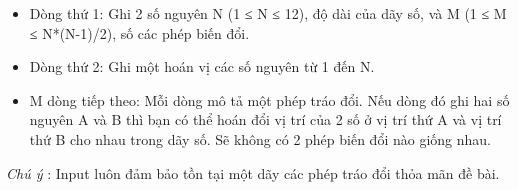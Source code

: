 \begin{itemize}
	\item     Dòng thứ 1: Ghi 2 số nguyên N (1 ≤ N ≤ 12), độ dài của dãy số, và M (1 ≤ M ≤ N*(N-1)/2), số các phép biến đổi.   
\end{itemize}
\begin{itemize}
	\item     Dòng thứ 2: Ghi một hoán vị các số nguyên từ 1 đến N.   
	\item     M dòng tiếp theo: Mỗi dòng mô tả một phép tráo đổi. Nếu dòng đó ghi hai số nguyên A và B thì bạn có thể hoán đổi vị trí của 2 số ở vị trí thứ A và vị trí thứ B cho nhau trong dãy số. Sẽ không có 2 phép biến đổi nào giống nhau.   
\end{itemize}

\emph{    Chú ý   }   : Input luôn đảm bảo tồn tại một dãy các phép tráo đổi thỏa mãn đề bài.  

\
